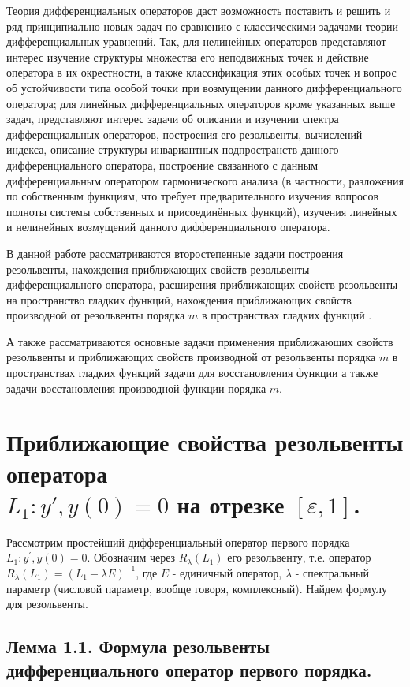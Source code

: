 Теория дифференциальных операторов даст возможность поставить и решить и ряд принципиально новых задач по сравнению с классическими задачами теории дифференциальных уравнений. Так, для нелинейных операторов представляют интерес изучение структуры множества его неподвижных точек и действие оператора в их окрестности, а также классификация этих особых точек и вопрос об устойчивости типа особой точки при возмущении данного дифференциального оператора; для линейных дифференциальных операторов кроме указанных выше задач, представляют интерес задачи об описании и изучении спектра дифференциальных операторов, построения его резольвенты, вычислений индекса, описание структуры инвариантных подпространств данного дифференциального оператора, построение связанного с данным дифференциальным оператором гармонического анализа (в частности, разложения по собственным функциям, что требует предварительного изучения вопросов полноты системы собственных и присоединённых функций), изучения линейных и нелинейных возмущений данного дифференциального оператора.

В данной работе рассматриваются второстепенные задачи построения резольвенты, нахождения  приближающих свойств резольвенты дифференциального оператора, расширения приближающих свойств резольвенты на пространство гладких функций, нахождения приближающих свойств производной от резольвенты порядка $ m $ в пространствах гладких функций \cite{Schtraus:1954}. 

А также рассматриваются основные задачи применения приближающих свойств резольвенты и приближающих свойств производной от резольвенты порядка $ m $ в пространствах гладких функций задачи для восстановления функции а также задачи восстановления производной функции порядка $ m $.


\chapter{Приближающие свойства резольвенты оператора \\ $ L_1:y', y(0)=0 $ на отрезке $ [\varepsilon, 1] $.}
Рассмотрим простейший дифференциальный оператор первого порядка $ L_1:y^{'}, y(0)=0 $. Обозначим через $ R_\lambda(L_1) $ его резольвенту, т.е. оператор $ R_\lambda(L_1)=(L_1-\lambda E)^{-1} $, где $ E $ - единичный оператор, $ \lambda $ - спектральный параметр (числовой параметр,  вообще говоря, комплексный). Найдем формулу для резольвенты.

\section{Лемма 1.1. Формула резольвенты дифференциального оператор первого порядка.}
\label{lemma1.1}

